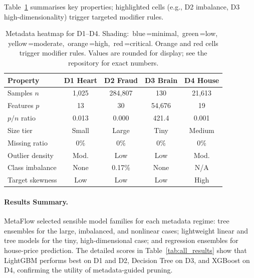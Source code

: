 \documentclass[runningheads]{llncs}
\begin{document}
Table~\ref{tab:metadata_heatmap} summarises key properties; highlighted cells (e.g., D2 imbalance, D3 high-dimensionality) trigger targeted modifier rules.

\begin{table}[!htbp]
\centering
\caption{Metadata heatmap for D1--D4. Shading: \colorbox{hBlue}{\,blue\,}=minimal,
\colorbox{hGreen}{\,green\,}=low, \colorbox{hYellow}{\,yellow\,}=moderate,
\colorbox{hOrange}{\,orange\,}=high, \colorbox{hRed}{\,red\,}=critical.
Orange and red cells trigger modifier rules. Values are rounded for display; see
the repository for exact numbers.}
\label{tab:metadata_heatmap}
\small
\setlength{\tabcolsep}{4pt}
\renewcommand{\arraystretch}{1.15}
\begin{tabular}{@{}l cccc@{}}
\toprule
\textbf{Property} & \textbf{D1 Heart} & \textbf{D2 Fraud} & \textbf{D3 Brain} & \textbf{D4 House} \\
\midrule
Samples $n$      & \cellcolor{hYellow}1,025    & \cellcolor{hRed}284,807   & \cellcolor{hBlue}130      & \cellcolor{hOrange}21,613 \\
Features $p$     & \cellcolor{hGreen}13        & \cellcolor{hGreen}30      & \cellcolor{hRed}54,676    & \cellcolor{hGreen}19      \\
$p/n$ ratio      & \cellcolor{hGreen}0.013     & \cellcolor{hGreen}0.000   & \cellcolor{hRed}421.4     & \cellcolor{hGreen}0.001   \\
Size tier        & \cellcolor{hYellow}Small    & \cellcolor{hRed}Large     & \cellcolor{hBlue}Tiny     & \cellcolor{hOrange}Medium \\
Missing ratio    & \cellcolor{hGreen}0\%       & \cellcolor{hGreen}0\%     & \cellcolor{hGreen}0\%     & \cellcolor{hGreen}0\%     \\
Outlier density  & \cellcolor{hYellow}Mod.     & \cellcolor{hGreen}Low     & \cellcolor{hGreen}Low     & \cellcolor{hYellow}Mod.   \\
Class imbalance  & \cellcolor{hGreen}None      & \cellcolor{hRed}0.17\%    & \cellcolor{hGreen}None    & \cellcolor{hGray}N/A      \\
Target skewness  & \cellcolor{hGreen}Low       & \cellcolor{hGreen}Low     & \cellcolor{hGreen}Low     & \cellcolor{hOrange}High   \\
\bottomrule
\end{tabular}
\end{table}

\paragraph{Results Summary.}
MetaFlow selected sensible model families for each metadata regime: tree
ensembles for the large, imbalanced, and nonlinear cases; lightweight linear and
tree models for the tiny, high-dimensional case; and regression ensembles for
house-price prediction. The detailed scores in Table~\ref{tab:all_results} show that LightGBM performs best on D1 and D2, Decision Tree on D3, and XGBoost on D4, confirming the utility of metadata-guided pruning.
\end{document}
